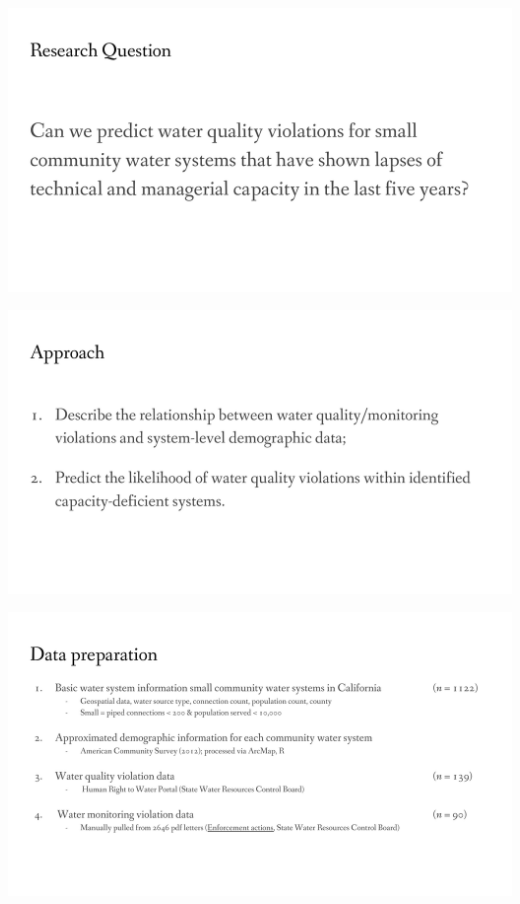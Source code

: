 \documentclass[aspectratio=169]{beamer}
\begin{document}
\begin{frame}
\includegraphics[width=1.1\textwidth]{seigi_5}
\end{frame}

\begin{frame}
\includegraphics[width=1.1\textwidth]{seigi_6}
\end{frame}

\begin{frame}
\includegraphics[width=1.1\textwidth]{seigi_7}
\end{frame}
\end{document}
